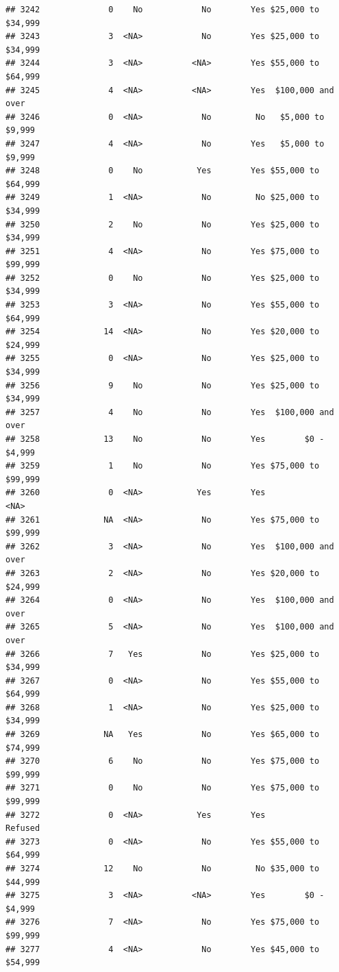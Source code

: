 \documentclass[man]{apa6}
\begin{document}
\begin{verbatim}
## 3242              0    No            No        Yes $25,000 to $34,999
## 3243              3  <NA>            No        Yes $25,000 to $34,999
## 3244              3  <NA>          <NA>        Yes $55,000 to $64,999
## 3245              4  <NA>          <NA>        Yes  $100,000 and over
## 3246              0  <NA>            No         No   $5,000 to $9,999
## 3247              4  <NA>            No        Yes   $5,000 to $9,999
## 3248              0    No           Yes        Yes $55,000 to $64,999
## 3249              1  <NA>            No         No $25,000 to $34,999
## 3250              2    No            No        Yes $25,000 to $34,999
## 3251              4  <NA>            No        Yes $75,000 to $99,999
## 3252              0    No            No        Yes $25,000 to $34,999
## 3253              3  <NA>            No        Yes $55,000 to $64,999
## 3254             14  <NA>            No        Yes $20,000 to $24,999
## 3255              0  <NA>            No        Yes $25,000 to $34,999
## 3256              9    No            No        Yes $25,000 to $34,999
## 3257              4    No            No        Yes  $100,000 and over
## 3258             13    No            No        Yes        $0 - $4,999
## 3259              1    No            No        Yes $75,000 to $99,999
## 3260              0  <NA>           Yes        Yes               <NA>
## 3261             NA  <NA>            No        Yes $75,000 to $99,999
## 3262              3  <NA>            No        Yes  $100,000 and over
## 3263              2  <NA>            No        Yes $20,000 to $24,999
## 3264              0  <NA>            No        Yes  $100,000 and over
## 3265              5  <NA>            No        Yes  $100,000 and over
## 3266              7   Yes            No        Yes $25,000 to $34,999
## 3267              0  <NA>            No        Yes $55,000 to $64,999
## 3268              1  <NA>            No        Yes $25,000 to $34,999
## 3269             NA   Yes            No        Yes $65,000 to $74,999
## 3270              6    No            No        Yes $75,000 to $99,999
## 3271              0    No            No        Yes $75,000 to $99,999
## 3272              0  <NA>           Yes        Yes            Refused
## 3273              0  <NA>            No        Yes $55,000 to $64,999
## 3274             12    No            No         No $35,000 to $44,999
## 3275              3  <NA>          <NA>        Yes        $0 - $4,999
## 3276              7  <NA>            No        Yes $75,000 to $99,999
## 3277              4  <NA>            No        Yes $45,000 to $54,999

\end{verbatim}
\end{document}
